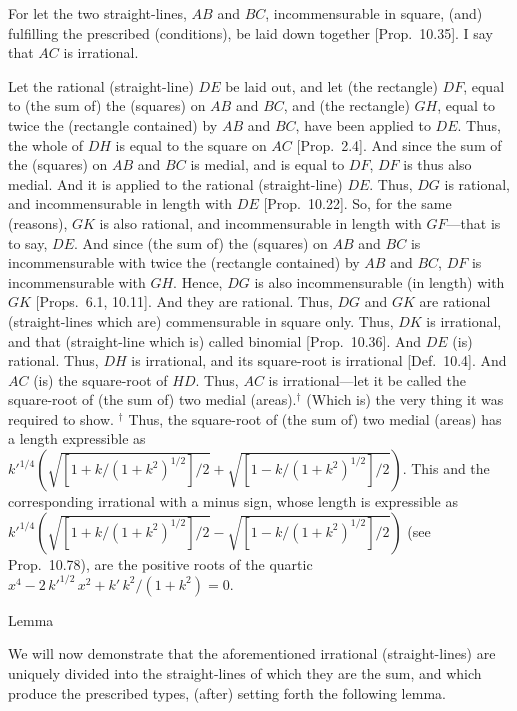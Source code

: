 \epsfysize=2.2in
\centerline{}

For let the two straight-lines, $AB$ and $BC$,  incommensurable
in square,  (and) fulfilling the prescribed (conditions), be laid down together
[Prop.~10.35]. I say that $AC$ is irrational.

Let the rational (straight-line) $DE$ be laid out, and let (the rectangle) $DF$,
equal to (the sum of) the (squares) on $AB$ and $BC$, and (the rectangle) $GH$, equal to twice the (rectangle contained) by
$AB$ and $BC$, have been applied
to $DE$. Thus, the whole of $DH$ is equal to the square on $AC$
[Prop.~2.4]. And since the sum of the (squares)
on $AB$ and $BC$ is medial, and is equal to $DF$, $DF$ is thus also
medial. And it is applied to the rational (straight-line) $DE$. 
Thus, $DG$ is rational, and incommensurable in length with $DE$ [Prop.~10.22]. So, for the same (reasons), $GK$
is also rational, and incommensurable in length with $GF$---that is
to say, $DE$. And since (the sum of) the (squares) on $AB$ and $BC$
is incommensurable with twice the (rectangle contained) by $AB$ and
$BC$, $DF$ is incommensurable with $GH$.
Hence, $DG$ is also incommensurable (in length)
with $GK$ [Props.~6.1, 10.11]. And they are rational. Thus, $DG$ and
$GK$ are rational (straight-lines which are) commensurable in square only. Thus, $DK$ is irrational, and that (straight-line which is) called binomial 
[Prop.~10.36]. And $DE$ (is) rational.
Thus, $DH$ is irrational, and its square-root is irrational [Def.~10.4]. And $AC$ (is) the square-root of $HD$. Thus,
$AC$ is irrational---let it be called the square-root of (the sum of) two medial
(areas).$^\dag$ (Which is) the very thing it was required to show.
{\footnotesize\noindent$^\dag$ Thus, the square-root
of (the sum of) two medial (areas)
has a length expressible as $k'^{1/4}\left(\sqrt{[1+k/(1+k^2)^{1/2}]/2}
+\sqrt{[1-k/(1+k^2)^{1/2}]/2}\right)$. This  and the corresponding irrational with a minus sign, whose length is expressible as $k'^{1/4}\left(\sqrt{[1+k/(1+k^2)^{1/2}]/2}
-\sqrt{[1-k/(1+k^2)^{1/2}]/2}\right)$
 (see Prop.~10.78), are
the positive roots of the quartic $x^4-2\,k'^{1/2}\,x^2+ k'\, k^2/(1+k^2)= 0$.} 


\begin{center}
{\large Lemma}
\end{center}

We will now demonstrate that the aforementioned irrational (straight-lines)
 are uniquely divided into the straight-lines  of which they are the sum,
 and which produce the prescribed types, 
 (after) setting forth the following
 lemma.
 
